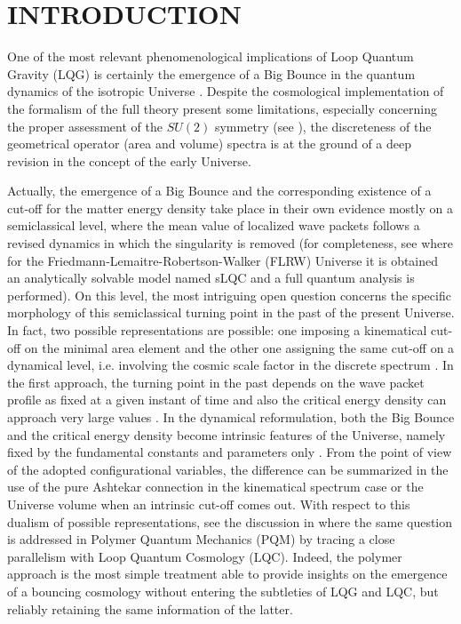 \documentclass[aps,prd,twocolumn,nofootinbib,superscriptaddress]{revtex4-2}
\begin{document}
\maketitle
	
\section{INTRODUCTION}

One of the most relevant phenomenological implications of Loop Quantum
Gravity (LQG) \cite{Rovelli,CQG} is certainly the
emergence of a Big Bounce in the quantum dynamics of the isotropic
Universe \cite{ashtekar2003,ashtekar2005gravity,Ashtekar2006,AshtekarI,Ashtekar2008,Ashtekar2011,B,bojowald2009,Ant,M,EFG}. Despite the cosmological implementation of the formalism of the full
theory present some limitations, especially concerning the proper
assessment of the $SU(2)$ symmetry
(see \cite{C1,C2,Alesci}), the
discreteness of the geometrical operator (area and volume) spectra is at
the ground of a deep revision in the
concept of the early Universe.

Actually, the emergence of a Big Bounce and the corresponding existence of
a cut-off for the matter energy density take place in their own
evidence mostly on a semiclassical level, where the mean value of
localized wave packets follows a revised dynamics in which the singularity
is removed (for completeness, see \cite{Ashtekar2008} where for the Friedmann-Lemaitre-Robertson-Walker (FLRW) Universe it is obtained an analytically solvable model named sLQC and a full quantum analysis is performed).
On this level, the most intriguing open question concerns the specific
morphology of this semiclassical turning point in the past of the present
Universe. In fact, two possible representations are possible:
one imposing a kinematical cut-off on the minimal area element
\cite{Ashtekar2006} and the other one
assigning the same cut-off on a dynamical level, i.e. involving the cosmic
scale factor in the discrete spectrum \cite{AshtekarI,Ashtekar2008}.
In the first approach, the turning point in the past depends on the wave
packet profile as fixed at a given instant of time and also the
critical energy density can approach very large values \cite{PC,CQG}. In the dynamical reformulation, both the Big Bounce and the
critical energy  density become intrinsic features of the Universe, namely
fixed by the fundamental constants and parameters only \cite{AshtekarI}.
From the point of view of the adopted configurational variables, the
difference can be summarized in the use of the pure Ashtekar connection in
the kinematical spectrum case or the Universe volume when
an intrinsic cut-off comes out.
With respect to this dualism of possible representations, see the
discussion in \cite{EFG} where the same question is
addressed in Polymer Quantum Mechanics (PQM) by tracing a close parallelism with
Loop Quantum Cosmology (LQC). Indeed, the polymer approach \cite{ASHTEKARpol,Pol} is the most simple treatment able to provide insights on the emergence of a
bouncing cosmology without entering the
subtleties of LQG and LQC, but reliably retaining
the same information of the latter.
\end{document}
